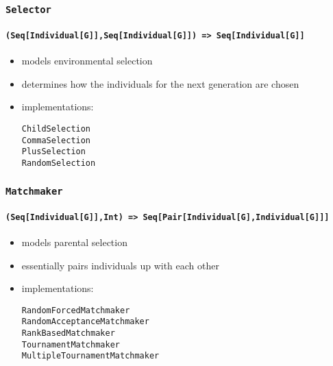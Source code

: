 \documentclass[compress,xcolor=table]{beamer}
\begin{document}
\begin{frame}
  \frametitle{\texttt{Selector}}
  \framesubtitle{\texttt{(Seq[Individual[G]],Seq[Individual[G]]) => Seq[Individual[G]]}}
  \begin{itemize}
    \item models environmental selection
    \item determines how the individuals for the next generation are chosen
    \item implementations:
    \begin{description}
      \item[\texttt{ChildSelection}]
      \item[\texttt{CommaSelection}]
      \item[\texttt{PlusSelection}]
      \item[\texttt{RandomSelection}]
    \end{description}
  \end{itemize}
\end{frame}

\begin{frame}
  \frametitle{\texttt{Matchmaker}}
  \framesubtitle{\texttt{(Seq[Individual[G]],Int) => Seq[Pair[Individual[G],Individual[G]]]}}
  \begin{itemize}
    \item models parental selection
    \item essentially pairs individuals up with each other
    \item implementations:
    \begin{description}
      \item[\texttt{RandomForcedMatchmaker}]
      \item[\texttt{RandomAcceptanceMatchmaker}]
      \item[\texttt{RankBasedMatchmaker}]
      \item[\texttt{TournamentMatchmaker}]
      \item[\texttt{MultipleTournamentMatchmaker}]
    \end{description}
  \end{itemize}
\end{frame}
\end{document}

